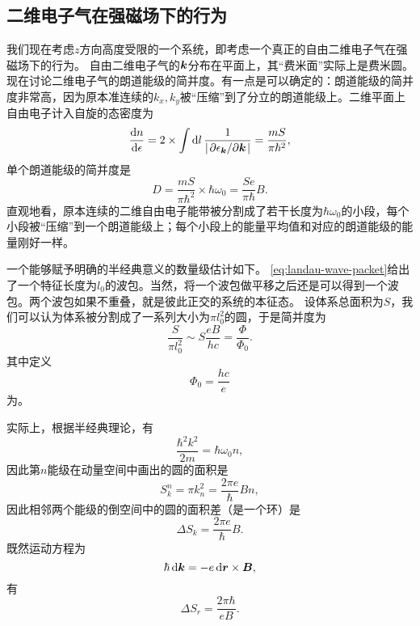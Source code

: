 \subsection{二维电子气在强磁场下的行为}\label{sec:2d-electron-magnetic-field}

我们现在考虑$z$方向高度受限的一个系统，即考虑一个真正的自由二维电子气在强磁场下的行为。
自由二维电子气的$\vb*{k}$分布在平面上，其“费米面”实际上是费米圆。
现在讨论二维电子气的朗道能级的简并度。有一点是可以确定的：朗道能级的简并度非常高，因为原本准连续的$k_x, k_y$被“压缩”到了分立的朗道能级上。二维平面上自由电子计入自旋的态密度为
\begin{equation}
    \dv{n}{\epsilon} = 2 \times \int \dd{l} \frac{1}{\abs{\pdv*{\epsilon_{\vb*{k}}}{\vb*{k}}}} = \frac{m S}{\pi \hbar^2},
\end{equation}
单个朗道能级的简并度是
\begin{equation}
    D = \frac{m S}{\pi \hbar^2} \times \hbar \omega_0 = \frac{S e}{\pi \hbar} B.
\end{equation}
直观地看，原本连续的二维自由电子能带被分割成了若干长度为$\hbar \omega_0$的小段，每个小段被“压缩”到一个朗道能级上；每个小段上的能量平均值和对应的朗道能级的能量刚好一样。

一个能够赋予明确的半经典意义的数量级估计如下。
\eqref{eq:landau-wave-packet}给出了一个特征长度为$l_0$的波包。当然，将一个波包做平移之后还是可以得到一个波包。两个波包如果不重叠，就是彼此正交的系统的本征态。
设体系总面积为$S$，我们可以认为体系被分割成了一系列大小为$\pi l_0^2$的圆，于是简并度为
\[
    \frac{S}{\pi l_0^2} \sim S \frac{eB}{h c} = \frac{\Phi}{\Phi_0}.
\]
其中定义
\begin{equation}
    \Phi_0 = \frac{h c}{e}
\end{equation}
为。

实际上，根据半经典理论，有
\[
    \frac{\hbar^2 k^2}{2m} = \hbar \omega_0 n,
\]
因此第$n$能级在动量空间中画出的圆的面积是
\begin{equation}
    S_k^n = \pi k_n^2 = \frac{2 \pi e}{\hbar} B n,
\end{equation}
因此相邻两个能级的倒空间中的圆的面积差（是一个环）是
\begin{equation}
    \Delta S_k = \frac{2 \pi e}{\hbar} B.
\end{equation}
既然运动方程为
\[
    \hbar \dd{\vb*{k}} = - e \dd{\vb*{r}} \times \vb*{B},
\]
有
\begin{equation}
    \Delta S_r = \frac{2\pi \hbar}{eB}.
\end{equation}

